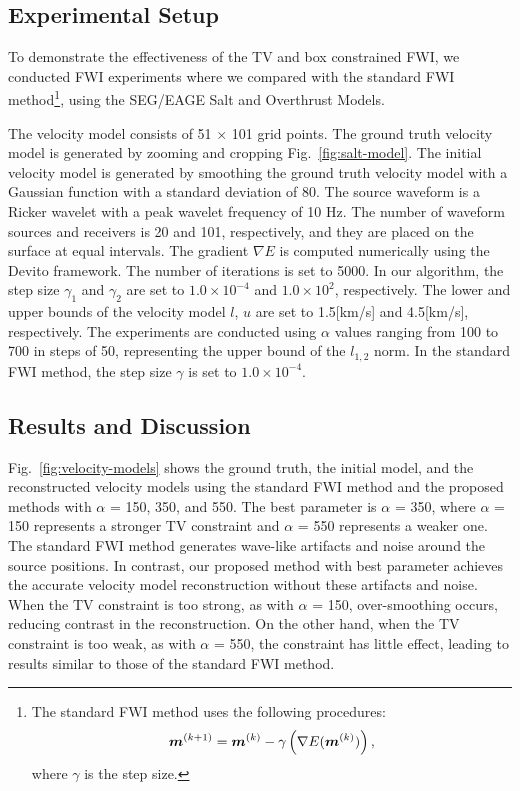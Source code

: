 

\subsection{Experimental Setup} \label{subsec:experimental-setup}

To demonstrate the effectiveness of the TV and box constrained FWI, we conducted FWI experiments where we compared with the standard FWI method\footnote{
    The standard FWI method uses the following procedures:
    \begin{equation} \label{eq:FWIWithGradient} \bm{m}^{(k+1)} = \bm{m}^{(k)} - \gamma \left( \nabla E(\bm{m}^{(k)}) \right), \end{equation} where $\gamma$ is the step size.
}\cite{FWI0}, using the SEG/EAGE Salt and Overthrust Models.

The velocity model consists of 51 $\times$ 101 grid points.
The ground truth velocity model is generated by zooming and cropping Fig.~\ref{fig:salt-model}.
The initial velocity model is generated by smoothing the ground truth velocity model with a Gaussian function with a standard deviation of 80.
The source waveform is a Ricker wavelet with a peak wavelet frequency of 10 Hz.
The number of waveform sources and receivers is 20 and 101, respectively, and they are placed on the surface at equal intervals.
The gradient $\nabla E$ is computed numerically using the Devito framework\cite{devito}.
The number of iterations is set to 5000.
In our algorithm, the step size $\gamma_1$ and $\gamma_2$ are set to $1.0 \times 10^{-4}$ and $1.0 \times 10^2$, respectively.
The lower and upper bounds of the velocity model $l$, $u$ are set to 1.5[km/s] and 4.5[km/s], respectively.
The experiments are conducted using $\alpha$ values ranging from 100 to 700 in steps of 50, representing the upper bound of the $l_{1,2}$ norm.
In the standard FWI method, the step size $\gamma$ is set to $1.0 \times 10^{-4}$.





\subsection{Results and Discussion} \label{subsec:results-and-discussion}

Fig.~\ref{fig:velocity-models} shows the ground truth, the initial model, and the reconstructed velocity models using the standard FWI method and the proposed methods with $\alpha$ = 150, 350, and 550.
The best parameter is $\alpha$ = 350, where $\alpha$ = 150 represents a stronger TV constraint and $\alpha$ = 550 represents a weaker one.
The standard FWI method generates wave-like artifacts and noise around the source positions.
In contrast, our proposed method with best parameter achieves the accurate velocity model reconstruction without these artifacts and noise.
When the TV constraint is too strong, as with $\alpha$ = 150, over-smoothing occurs, reducing contrast in the reconstruction.
On the other hand, when the TV constraint is too weak, as with $\alpha$ = 550, the constraint has little effect, leading to results similar to those of the standard FWI method.


